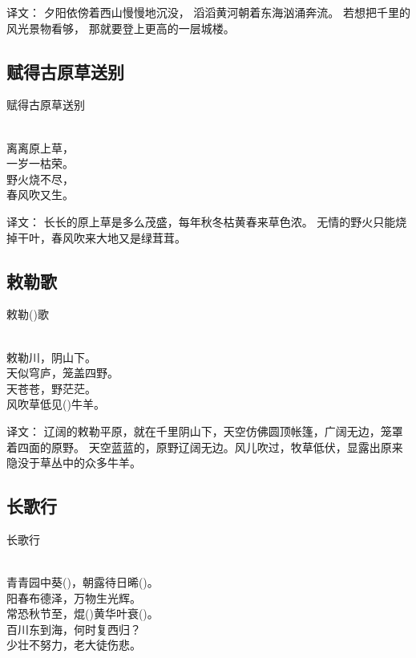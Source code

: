 译文：
夕阳依傍着西山慢慢地沉没， 滔滔黄河朝着东海汹涌奔流。
若想把千里的风光景物看够， 那就要登上更高的一层城楼。

\subsection{赋得古原草送别}

\noindent 赋得古原草送别

  \\

\noindent 离离原上草，\\一岁一枯荣。\\
野火烧不尽，\\春风吹又生。

译文：
长长的原上草是多么茂盛，每年秋冬枯黄春来草色浓。
无情的野火只能烧掉干叶，春风吹来大地又是绿茸茸。

\subsection{敕勒歌}

\noindent 敕勒()歌

  \\

\noindent 敕勒川，阴山下。\\天似穹庐，笼盖四野。\\
天苍苍，野茫茫。\\风吹草低见()牛羊。

译文：
辽阔的敕勒平原，就在千里阴山下，天空仿佛圆顶帐篷，广阔无边，笼罩着四面的原野。
天空蓝蓝的，原野辽阔无边。风儿吹过，牧草低伏，显露出原来隐没于草丛中的众多牛羊。

\subsection{长歌行}

\noindent 长歌行

  \\

\noindent 青青园中葵()，朝露待日晞()。\\
阳春布德泽，万物生光辉。\\
常恐秋节至，焜()黄华叶衰()。\\
百川东到海，何时复西归？\\
少壮不努力，老大徒伤悲。

